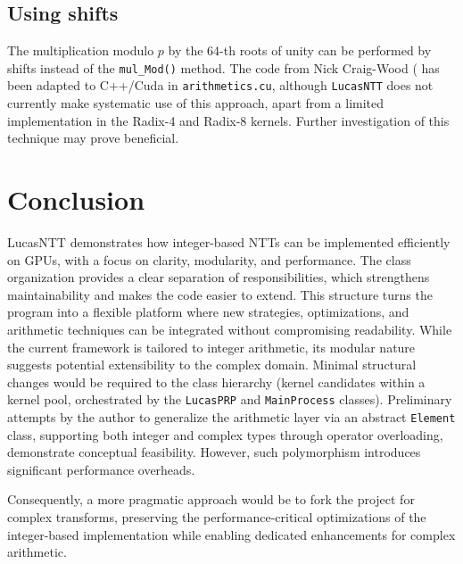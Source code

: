 \documentclass{article}
\begin{document}
\subsection{Using shifts}
The multiplication modulo $p$ by the 64-th roots of unity can be performed by shifts instead of the \texttt{mul\_Mod()} method. The code from Nick Craig-Wood (\cite{ncw14} has been adapted to C++/Cuda in \texttt{arithmetics.cu}, although \texttt{LucasNTT} does not currently make systematic use of this approach, apart from a limited implementation in the Radix-4 and Radix-8 kernels. Further investigation of this technique may prove beneficial.

\newpage
\section{Conclusion}

LucasNTT demonstrates how integer-based NTTs can be implemented efficiently on GPUs, with a focus on clarity, modularity, and performance. The class organization provides a clear separation of responsibilities, which strengthens maintainability and makes the code easier to extend. This structure turns the program into a flexible platform where new strategies, optimizations, and arithmetic techniques can be integrated without compromising readability. 
While the current framework is tailored to integer arithmetic, its modular nature suggests potential extensibility to the complex domain. Minimal structural changes would be required to the class hierarchy (kernel candidates within a kernel pool, orchestrated by the \texttt{LucasPRP} and \texttt{MainProcess} classes). Preliminary attempts by the author to generalize the arithmetic layer via an abstract \texttt{Element} class, supporting both integer and complex types through operator overloading, demonstrate conceptual feasibility. However, such polymorphism introduces significant performance overheads.

Consequently, a more pragmatic approach would be to fork the project for complex transforms, preserving the performance-critical optimizations of the integer-based implementation while enabling dedicated enhancements for complex arithmetic.

\newpage
  

\end{document}
